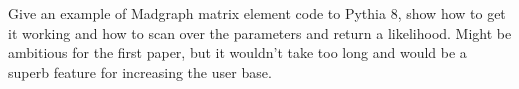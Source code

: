 Give an example of Madgraph matrix element code to Pythia 8, show how to get it working and how to scan over the parameters and return a likelihood. Might be ambitious for the first paper, but it wouldn't take too long and would be a superb feature for increasing the user base.
